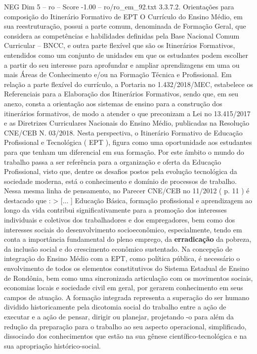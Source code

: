 \begin{textsample}{NEG Dim 5 – ro – Score -1.00 – ro/ro\_em\_92.txt}  \label{ex:f5_neg_173}
3.3.7.2.
Orientações para composição do Itinerário Formativo de EPT O Currículo do Ensino Médio, em sua reestruturação, possui a parte comum, denominada de Formação Geral, que considera as competências e habilidades definidas pela Base Nacional Comum Curricular – BNCC, e outra parte flexível que são os Itinerários Formativos, entendidos como um conjunto de unidades em que os estudantes podem escolher a partir do seu interesse para aprofundar e ampliar aprendizagens em uma ou mais Áreas de Conhecimento e/ou na Formação Técnica e Profissional.
Em relação a parte flexível do currículo, a Portaria no 1.432/2018/MEC, estabelece os Referenciais para a Elaboração dos Itinerários Formativos, sendo que, em seu anexo, consta a orientação aos sistemas de ensino para a construção dos itinerários formativos, de modo a atender o que preconizam a Lei no 13.415/2017 e as Diretrizes Curriculares Nacionais do Ensino Médio, publicadas na Resolução CNE/CEB N. 03/2018.
Nesta perspectiva, o Itinerário Formativo de Educação Profissional e Tecnológica ( EPT ), figura como uma oportunidade aos estudantes para que tenham um diferencial em sua formação.
Por este âmbito o mundo do trabalho passa a ser referência para a organização e oferta da Educação Profissional, visto que, dentre os desafios postos pela evolução tecnológica da sociedade moderna, está o conhecimento e domínio de processos de trabalho.
Nessa mesma linha de pensamento, no Parecer CNE/CEB no 11/2012 ( p. 11 ) é destacado que : > [... ] Educação Básica, formação profissional e aprendizagem ao longo da vida contribui significativamente para a promoção dos interesses individuais e coletivos dos trabalhadores e dos empregadores, bem como dos interesses sociais do desenvolvimento socioeconômico, especialmente, tendo em conta a importância fundamental do pleno emprego, da \textbf{erradicação} da pobreza, da inclusão social e do crescimento econômico sustentado.
Na concepção de integração do Ensino Médio com a EPT, como política pública, é necessário o envolvimento de todos os elementos constitutivos do Sistema Estadual de Ensino de Rondônia, bem como uma sincronizada articulação com os movimentos sociais, economias locais e sociedade civil em geral, por gerarem conhecimento em seus campos de atuação.
A formação integrada representa a superação do ser humano dividido historicamente pela dicotomia social do trabalho entre a ação de executar e a ação de pensar, dirigir ou planejar, projetando -o para além da redução da preparação para o trabalho ao seu aspecto operacional, simplificado, dissociado dos conhecimentos que estão na sua gênese científico-tecnológica e na sua apropriação histórico-social.

\end{textsample}
